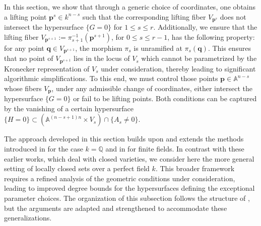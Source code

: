 \documentclass[pdflatex,sn-basic]{sn-jnl}%
\theoremstyle{thmstyleone}%
\theoremstyle{thmstyletwo}%
\theoremstyle{thmstylethree}%
\theoremstyle{definition}
\numberwithin{equation}{section}
\newcommand{\bfs}{\boldsymbol}
\newcommand{\A}{\mathbb A}
\newcommand{\Q}{\mathbb Q}
\begin{document}
In this section, we show that through a generic choice of
coordinates, one obtains a lifting point $\bfs p^s\in k^{n-s}$ such
that the corresponding lifting fiber $V_{\bfs p^s}$ does not
intersect the hypersurface $\{G=0\}$ for $1\le s \le r$.
Additionally, we ensure that the lifting fiber $V_{\bfs
p^{s+1}}:=\pi_{s+1}^{-1}(\bfs p^{s+1})$, for $0\le s \le r-1$, has
the following property: for any point $\bfs q\in V_{\bfs p^{s+1}}$,
the morphism $\pi_s$ is unramified at $\pi_s(\bfs q)$. This ensures
that no point of $V_{\bfs p^{s+1}}$ lies in the locus of $V_s$ which
cannot be parametrized by the Kronecker representation of $V_s$
under consideration, thereby leading to significant algorithmic
simplifications. To this end, we must control those points $\bfs
p\in\A^{n-s}$ whose fibers $V_{\bfs p}$, under any admissible change
of coordinates, either intersect the hypersurface $\{G=0\}$ or fail
to be lifting points. Both conditions can be captured by the
vanishing of a certain hypersurface $\{H=0\}\subset
(\A^{(n-s+1)n}\times V_s)\cap\{A_s\not=0\}$.

The approach developed in this section builds upon and extends the
methods introduced in \cite{HeMaWa01} for the case $k=\Q$ and in
\cite{CaMa06a} for finite fields. In contrast with these earlier
works, which deal with closed varieties, we consider here the more
general setting of locally closed sets over a perfect field $k$.
This broader framework requires a refined analysis of the geometric
conditions under consideration, leading to improved degree bounds
for the hypersurfaces defining the exceptional parameter choices.
The organization of this subsection follows the structure of
\cite{HeMaWa01,CaMa06a}, but the arguments are adapted and
strengthened to accommodate these generalizations.
\end{document}
